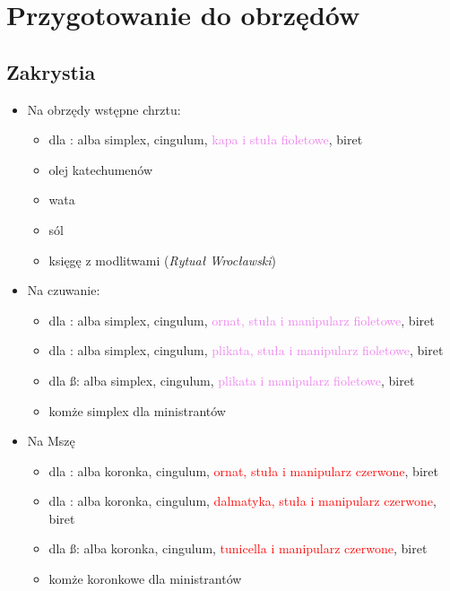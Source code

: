 \section{Przygotowanie do obrzędów}

\subsection{Zakrystia}
\begin{itemize}
	\item Na obrzędy wstępne chrztu:
	      \begin{itemize}
		      \item dla \ii: alba simplex, cingulum, \textcolor{violet}{kapa i
			            stuła fioletowe}, biret
		      \item olej katechumenów
		      \item wata
		      \item sól
		      \item księgę z modlitwami (\textit{Rytuał Wrocławski})
	      \end{itemize}
	\item Na czuwanie:
	      \begin{itemize}
		      \item dla \ii: alba simplex, cingulum, \textcolor{violet}{ornat,
			            stuła i manipularz fioletowe}, biret
		      \item dla \dd: alba simplex, cingulum, \textcolor{violet}{plikata,
			            stuła i manipularz fioletowe}, biret
		      \item dla \ss: alba simplex, cingulum, \textcolor{violet}{plikata
			            i manipularz fioletowe}, biret
		      \item komże simplex dla ministrantów
	      \end{itemize}
	\item Na Mszę
	      \begin{itemize}
		      \item dla \ii: alba koronka, cingulum, \textcolor{red}{ornat,
			            stuła i manipularz czerwone}, biret
		      \item dla \dd: alba koronka, cingulum, \textcolor{red}{dalmatyka,
			            stuła i manipularz czerwone}, biret
		      \item dla \ss: alba koronka, cingulum, \textcolor{red}{tunicella
			            i manipularz czerwone}, biret
		      \item komże koronkowe dla ministrantów
	      \end{itemize}
\end{itemize}

